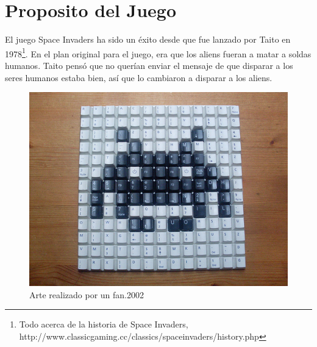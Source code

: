 \documentclass[a4paper]{article} %
\begin{document}
\section{Proposito del Juego}
El juego Space Invaders ha sido un éxito desde que fue lanzado por Taito en 1978\footnote{Todo acerca de la historia de Space Invaders, http://www.classicgaming.cc/classics/spaceinvaders/history.php}. En el plan original para el juego, era que los aliens fueran a matar a soldas humanos. Taito pensó que no querían enviar el mensaje de que disparar a los  seres humanos  estaba bien, así que lo cambiaron a disparar a los aliens.\\
\begin{figure}
  \centering
    \includegraphics[scale=0.5]{images/spaceinvfun}
  \caption{Arte realizado por un fan.2002}
  \label{fig:arte}
\end{figure}
\end{document}
